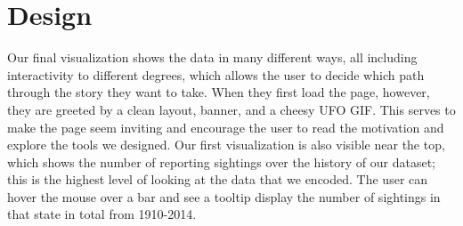 \documentclass[journal]{vgtc}                %
\begin{document}



\section{Design}


%
%
%

%
%
%


Our final visualization shows the data in many different ways, all including interactivity to different degrees, which allows the user to decide which path through the story they want to take. When they first load the page, however, they are greeted by a clean layout, banner, and a cheesy UFO GIF. This serves to make the page seem inviting and encourage the user to read the motivation and explore the tools we designed. Our first visualization is also visible near the top, which shows the number of reporting sightings over the history of our dataset; this is the highest level of looking at the data that we encoded. The user can hover the mouse over a bar and see a tooltip display the number of sightings in that state in total from 1910-2014.
\end{document}
